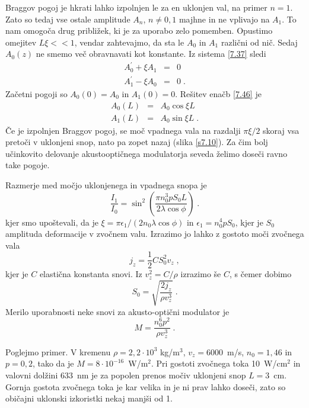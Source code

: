 Braggov pogoj je hkrati lahko izpolnjen le za en uklonjen val, na
primer $n=1$. Zato so tedaj vse ostale amplitude $A_{n}$, $n\ne0,1$
majhne in ne vplivajo na $A_{1}$. To nam omogoča drug približek,
ki je za uporabo zelo pomemben. Opustimo omejitev $L\xi<<1$, vendar
zahtevajmo, da sta le $A_{0}$ in $A_{1}$ različni od nič. Sedaj
$A_{0}(z)$ ne smemo več obravnavati kot konstante. Iz sistema \ref{7.37}
sledi 
\begin{eqnarray}
A_{0}^{\prime}+\xi A_{1} & = & 0\nonumber \\
A_{1}^{\prime}-\xi A_{0} & = & 0\;.
\end{eqnarray}
 Začetni pogoji so $A_{0}(0)=A_{0}$ in $A_{1}(0)=0$. Rešitev enačb
\ref{7.46} je 
\begin{eqnarray}
A_{0}(L) & = & A_{0}\cos\xi L\nonumber \\
A_{1}(L) & = & A_{0}\sin\xi L\;.
\end{eqnarray}
 Če je izpolnjen Braggov pogoj, se moč vpadnega vala na razdalji $\pi\xi/2$
skoraj vsa pretoči v uklonjeni snop, nato pa zopet nazaj (slika \ref{s7.10}).
Za čim bolj učinkovito delovanje akustooptičnega modulatorja seveda
želimo doseči ravno take pogoje.

Razmerje med močjo uklonjenega in vpadnega snopa je 
\begin{equation}
\frac{I_{1}}{I_{0}}=\sin^{2}\left(\frac{\pi n_{0}^{3}pS_{0}L}{2\lambda\cos\phi}\right)\;.\label{7.48}
\end{equation}
 kjer smo upoštevali, da je $\xi=\pi\epsilon_{1}/(2n_{0}\lambda\cos\phi)$
in $\epsilon_{1}=n_{0}^{4}pS_{0}$, kjer je $S_{0}$ amplituda deformacije
v zvočnem valu. Izrazimo jo lahko z gostoto moči zvočnega vala 
\begin{equation}
j_{z}=\frac{1}{2}CS_{0}^{2}v_{z}\;,\label{7.49}
\end{equation}
 kjer je $C$ elastična konstanta snovi. Iz $v_{z}^{2}=C/\rho$ izrazimo
še $C$, s čemer dobimo 
\begin{equation}
S_{0}=\sqrt{\frac{2j_{z}}{\rho v_{z}^{3}}}\;.\label{7.50}
\end{equation}
 Merilo uporabnosti neke snovi za akusto-optični modulator je 
\begin{equation}
M=\frac{n_{0}^{6}p^{2}}{\rho v_{z}^{3}}\;.\label{7.51}
\end{equation}

Poglejmo primer. V kremenu $\rho=2,2\cdot10^{3}$ kg/m$^{3}$, $v_{z}=6000$~m/s,
$n_{0}=1,46$ in $p=0,2$, tako da je $M=8\cdot10^{-16}$~W/m$^{2}$.
Pri gostoti zvočnega toka 10~W/cm$^{2}$ in valovni dolžini 633~nm
je za popolen prenos močiv uklonjeni snop $L=3$~cm. Gornja gostota
zvočnega toka je kar velika in je ni prav lahko doseči, zato so običajni
uklonski izkoristki nekaj manjši od 1.

